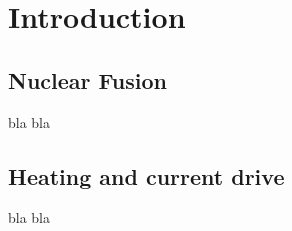 \setchapterpreamble[u]{\margintoc}
\chapter{Introduction}

\section{Nuclear Fusion}
bla bla


\section{Heating and current drive}
bla bla
